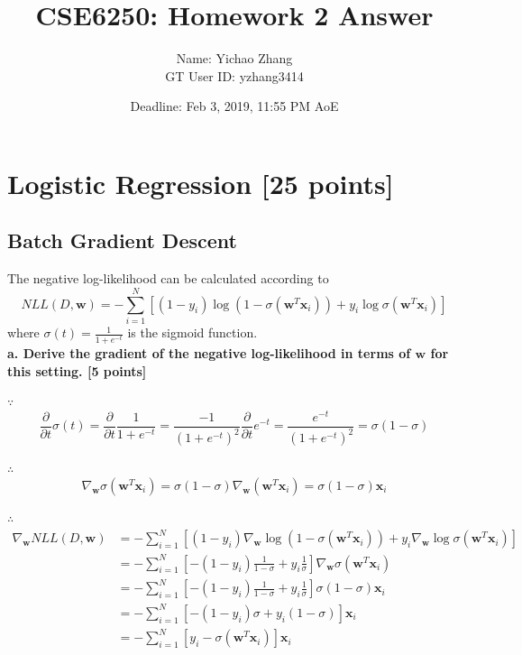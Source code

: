 \documentclass[12pt]{article}
\title{CSE6250: Homework 2 Answer}
\author{Name: Yichao Zhang\\ GT User ID: yzhang3414}
\date{Deadline: Feb 3, 2019, 11:55 PM AoE}
\begin{document}
\maketitle

\section{Logistic Regression [25 points]}
\subsection{Batch Gradient Descent}


The negative log-likelihood can be calculated according to
\begin{equation}
NLL\left (D, \mathbf{w} \right ) = -\sum_{i=1}^{N} \left [ \left ( 1 - y_i \right ) \log(1-\sigma(\mathbf{w}^T\mathbf{x}_i)) + y_i\log \sigma(\mathbf{w}^T\mathbf{x}_i)  \right ]
\label{eq:NLL}
\end{equation}
where $\sigma(t) = \frac{1}{1 + e^{-t}}$ is the sigmoid function.\\

\textbf{a. Derive the gradient of the negative log-likelihood in terms of $\mathbf{w}$ for this setting. [5 points] }

$\because $
\begin{equation}
\frac{\partial}{\partial t}\sigma(t) 
= \frac{\partial}{\partial t}\frac{1}{1 + e^{-t}} 
= \frac{-1}{(1 + e^{-t})^2} \frac{\partial}{\partial t} e^{-t}
= \frac{e^{-t}}{(1 + e^{-t})^2}
= \sigma ( 1- \sigma)
\end{equation}

$\therefore$
\begin{equation}
\nabla_\mathbf{w}\sigma(\mathbf{w}^T\mathbf{x}_i) 
= \sigma ( 1- \sigma)\nabla_\mathbf{w} (\mathbf{w}^T\mathbf{x}_i)
= \sigma ( 1- \sigma)\mathbf{x}_i
\end{equation}

$\therefore$
\begin{equation}
\begin{aligned}
\nabla_\mathbf{w}NLL\left (D, \mathbf{w} \right ) 
& = -\sum_{i=1}^{N} \left [ 
\left ( 1 - y_i \right ) 
\nabla_\mathbf{w} \log(1-\sigma(\mathbf{w}^T\mathbf{x}_i)) 
+ y_i 
\nabla_\mathbf{w}\log \sigma(\mathbf{w}^T\mathbf{x}_i)  \right ] \\
& = -\sum_{i=1}^{N} \left [ 
-\left ( 1 - y_i \right ) \frac{1}{1-\sigma}
+ y_i \frac{1}{\sigma} 
\right ] \nabla_\mathbf{w} \sigma(\mathbf{w}^T\mathbf{x}_i) \\
& = -\sum_{i=1}^{N} \left [ 
-\left ( 1 - y_i \right ) \frac{1}{1-\sigma}
+ y_i \frac{1}{\sigma} 
\right ]
\sigma (1-\sigma)\mathbf{x}_i\\
& = -\sum_{i=1}^{N} \left [ 
-\left ( 1 - y_i \right ) \sigma
+ y_i (1-\sigma)
\right ]\mathbf{x}_i\\
& = -\sum_{i=1}^{N} \left [ 
y_i - \sigma(\mathbf{w}^T\mathbf{x}_i)
\right ]\mathbf{x}_i\\
\end{aligned} 
\label{eq:GradNLL}
\end{equation}
\end{document}
